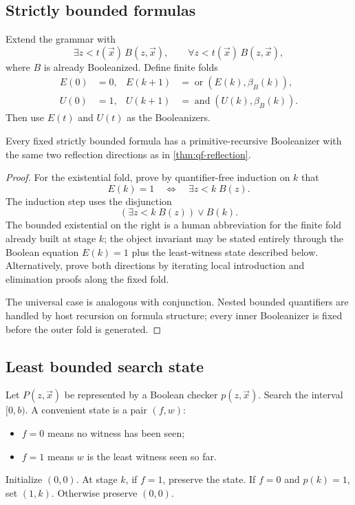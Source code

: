\subsection{Strictly bounded formulas}

Extend the grammar with
\[
 \exists z<t(\vec x)\,B(z,\vec x),
 \qquad
 \forall z<t(\vec x)\,B(z,\vec x),
\]
where \(B\) is already Booleanized.  Define finite folds
\begin{align*}
 E(0)&=0,&E(k+1)&=\operatorname{or}(E(k),\beta_B(k)),\\
 U(0)&=1,&U(k+1)&=\operatorname{and}(U(k),\beta_B(k)).
\end{align*}
Then use \(E(t)\) and \(U(t)\) as the Booleanizers.

\begin{theorem}\label{thm:bounded-reflection}
Every fixed strictly bounded formula has a primitive-recursive Booleanizer with the same two reflection directions as in \cref{thm:qf-reflection}.
\end{theorem}

\begin{proof}
For the existential fold, prove by quantifier-free induction on \(k\) that
\[
 E(k)=1\quad\Longleftrightarrow\quad \exists z<k\;B(z).
\]
The induction step uses the disjunction
\[
 (\exists z<k\;B(z))\vee B(k).
\]
The bounded existential on the right is a human abbreviation for the finite fold already built at stage \(k\); the object invariant may be stated entirely through the Boolean equation \(E(k)=1\) plus the least-witness state described below.  Alternatively, prove both directions by iterating local introduction and elimination proofs along the fixed fold.

The universal case is analogous with conjunction.  Nested bounded quantifiers are handled by host recursion on formula structure; every inner Booleanizer is fixed before the outer fold is generated.
\end{proof}

\subsection{Least bounded search state}

Let \(P(z,\vec x)\) be represented by a Boolean checker \(p(z,\vec x)\).  Search the interval \([0,b)\).  A convenient state is a pair \((f,w)\):
\begin{itemize}
\item \(f=0\) means no witness has been seen;
\item \(f=1\) means \(w\) is the least witness seen so far.
\end{itemize}
Initialize \((0,0)\).  At stage \(k\), if \(f=1\), preserve the state.  If \(f=0\) and \(p(k)=1\), set \((1,k)\).  Otherwise preserve \((0,0)\).


